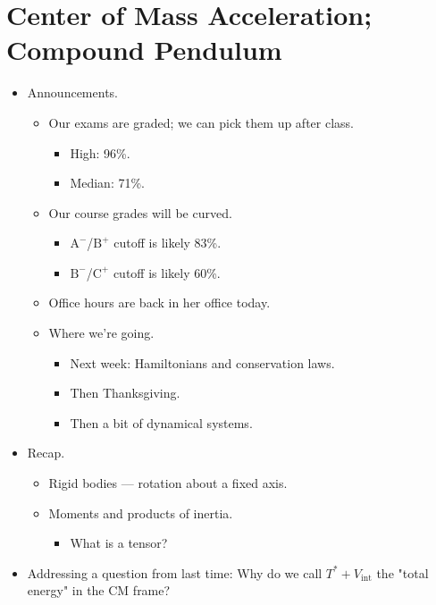 \documentclass[../notes.tex]{subfiles}
\begin{document}
\section{Center of Mass Acceleration; Compound Pendulum}
\begin{itemize}
    \item {}Announcements.
    \begin{itemize}
        \item Our exams are graded; we can pick them up after class.
        \begin{itemize}
            \item High: 96\%.
            \item Median: 71\%.
        \end{itemize}
        \item Our course grades will be curved.
        \begin{itemize}
            \item $\text{A}^-$/$\text{B}^+$ cutoff is likely 83\%.
            \item $\text{B}^-$/$\text{C}^+$ cutoff is likely 60\%.
        \end{itemize}
        \item Office hours are back in her office today.
        \item Where we're going.
        \begin{itemize}
            \item Next week: Hamiltonians and conservation laws.
            \item Then Thanksgiving.
            \item Then a bit of dynamical systems.
        \end{itemize}
    \end{itemize}
    \item Recap.
    \begin{itemize}
        \item Rigid bodies --- rotation about a fixed axis.
        \item Moments and products of inertia.
        \begin{itemize}
            \item What is a tensor?
        \end{itemize}
    \end{itemize}
    \item Addressing a question from last time: Why do we call $T^*+V_\text{int}$ the "total energy" in the CM frame?
    \begin{itemize}

\end{itemize}
\end{itemize}
\end{document}
